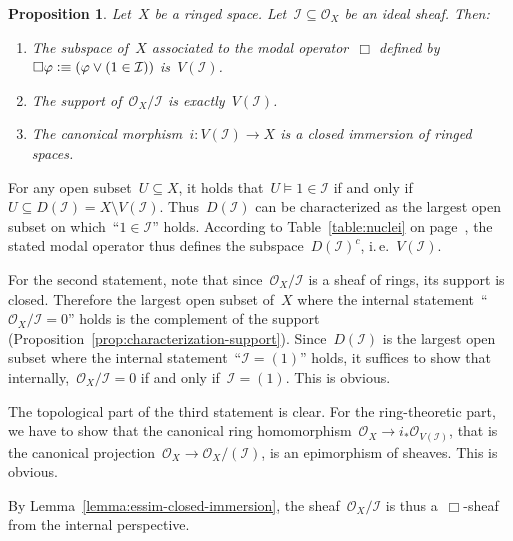 \documentclass[10pt,reqno,a4paper]{amsbook}
\makeatletter
\theoremstyle{definition}
\theoremstyle{plain}
\newtheorem{prop}[defn]{Proposition}
\theoremstyle{remark}
\renewcommand{\O}{\mathcal{O}}
\newcommand{\I}{\mathcal{I}}
\newcommand{\?}{\,{:}\,}
\renewcommand{\_}{\mathpunct{.}\,}
\newcommand{\ie}{i.\,e.\@\xspace}
\newcommand{\defequiv}{\vcentcolon\equiv}
\renewenvironment{proof}[1][\proofname]{\par
  \pushQED{\qed}%
  \normalfont \topsep6\p@\@plus6\p@\relax
  \trivlist
  \item[\hskip\labelsep
        \itshape
    #1\@addpunct{.}]\ignorespaces
}{%
  \popQED\endtrivlist\@endpefalse
}
\makeatother
\begin{document}
\begin{prop}\label{prop:basics-closed-subspace}
Let~$X$ be a ringed space. Let~$\I \subseteq \O_X$ be an ideal
sheaf. Then:
\begin{enumerate}
\item The subspace of~$X$ associated to the modal operator~$\Box$ defined
by~$\Box\varphi \defequiv (\varphi \vee (1 \in \I))$ is~$V(\I)$.
\item The support of~$\O_X/\I$ is exactly~$V(\I)$.
\item The canonical morphism~$i : V(\I) \to X$ is a closed immersion
of ringed spaces.
\end{enumerate}\end{prop}
\begin{proof}For any open subset~$U \subseteq X$, it holds that~$U \models 1
\in \I$ if and only if~$U \subseteq D(\I) = X \setminus V(\I)$. Thus~$D(\I)$
can be characterized as the largest open subset on which~``$1 \in \I$'' holds.
According to Table~\ref{table:nuclei} on page~\pageref{table:nuclei}, the
stated modal operator thus defines the subspace~$D(\I)^c$, \ie~$V(\I)$.

For the second statement, note that since~$\O_X/\I$ is a sheaf of rings, its
support is closed. Therefore the largest open subset of~$X$ where the internal
statement~``$\O_X/\I = 0$'' holds is the complement of the support
(Proposition~\ref{prop:characterization-support}). Since~$D(\I)$ is the largest
open subset where the internal statement~``$\I = (1)$'' holds, it suffices to
show that internally,~$\O_X/\I = 0$ if and only if~$\I = (1)$. This is obvious.

The topological part of the third statement is clear. For the ring-theoretic
part, we have to show that the canonical ring homomorphism~$\O_X \to i_*
\O_{V(\I)}$, that is the canonical projection~$\O_X \to \O_X/(\I)$, is an
epimorphism of sheaves. This is obvious.
\end{proof}

By Lemma~\ref{lemma:essim-closed-immersion}, the sheaf~$\O_X/\I$ is
thus a~$\Box$-sheaf from the internal perspective.
\end{document}
